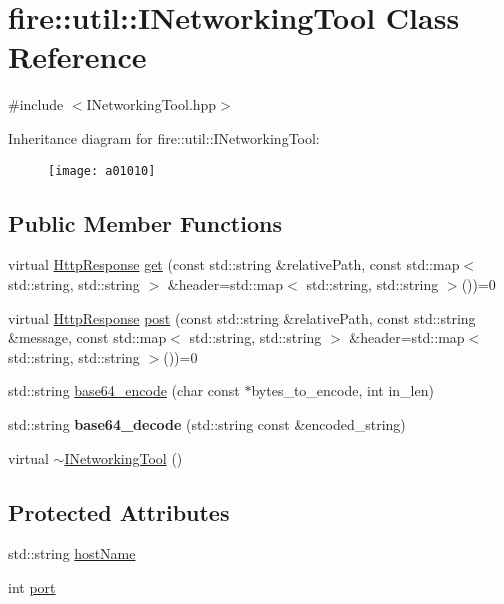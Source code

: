 \hypertarget{a01010}{}\section{fire\+:\+:util\+:\+:I\+Networking\+Tool Class Reference}
\label{a01010}


{\ttfamily \#include $<$I\+Networking\+Tool.\+hpp$>$}

Inheritance diagram for fire\+:\+:util\+:\+:I\+Networking\+Tool\+:\begin{figure}[H]
\begin{center}
\leavevmode
\texttt{[image: a01010]}
\end{center}
\end{figure}
\subsection*{Public Member Functions}
\begin{DoxyCompactItemize}
\item 
virtual \hyperlink{a01006}{Http\+Response} \hyperlink{a01010_a44b81ebf8421f0e32ed99b5e372ef007}{get} (const std\+::string \&relative\+Path, const std\+::map$<$ std\+::string, std\+::string $>$ \&header=std\+::map$<$ std\+::string, std\+::string $>$())=0
\item 
virtual \hyperlink{a01006}{Http\+Response} \hyperlink{a01010_ad6ff0e352d78f17a6f6184d1b80e0c94}{post} (const std\+::string \&relative\+Path, const std\+::string \&message, const std\+::map$<$ std\+::string, std\+::string $>$ \&header=std\+::map$<$ std\+::string, std\+::string $>$())=0
\item 
std\+::string \hyperlink{a01010_ab93be61530f01e64cb3c688976a6887b}{base64\+\_\+encode} (char const $\ast$bytes\+\_\+to\+\_\+encode, int in\+\_\+len)
\item 
\mbox{\label{a01010_ae050106ca2338332893606cea2f3881a}} 
std\+::string {\bfseries base64\+\_\+decode} (std\+::string const \&encoded\+\_\+string)
\item 
virtual \hyperlink{a01010_a2beca71d6ecb1688809f0e5e0548c17c}{$\sim$\+I\+Networking\+Tool} ()
\end{DoxyCompactItemize}
\subsection*{Protected Attributes}
\begin{DoxyCompactItemize}
\item 
std\+::string \hyperlink{a01010_ab7380b440faa49daffb65ca030380cde}{host\+Name}
\item 
int \hyperlink{a01010_ae640954c85632932a88037375a95abf4}{port}
\end{DoxyCompactItemize}


